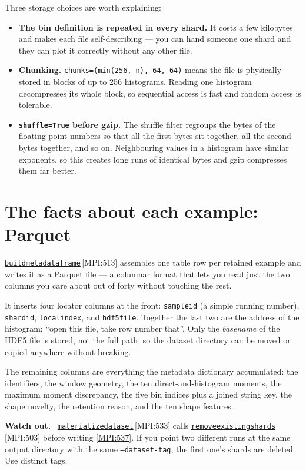 \documentclass[11pt,a4paper]{report}
\newcommand{\srcbase}{vscode://file/Users/syellapa/Documents/Research/2026/ANSYS/Multi-ScalarPDF}
\newcommand{\srctag}[1]{{\footnotesize\textcolor{TagGray}{[#1]}}}
\newcommand{\Mpi}[2]{\href{\srcbase/EnsightPDFHybridDatasetMPI.py:#1}{\texttt{#2}}\,\srctag{MPI:#1}}
\newcommand{\MpiL}[1]{\href{\srcbase/EnsightPDFHybridDatasetMPI.py:#1}{\srctag{MPI:#1}}}
\newcommand{\code}[1]{\texttt{#1}}
\renewcommand{\_}{\origtextunderscore\allowbreak}
\newlength{\calloutwidth}
\newcommand{\calloutOpen}{%
  \par\medskip\noindent
  \setlength{\calloutwidth}{\dimexpr\linewidth-2\fboxsep\relax}%
  \begin{lrbox}{\calloutbox}\begin{minipage}{\calloutwidth}}
\newcommand{\calloutClose}[1]{%
  \end{minipage}\end{lrbox}\colorbox{#1}{\usebox{\calloutbox}}\par\medskip}
\newenvironment{caution}
  {\calloutOpen\textbf{Watch out.}\ }
  {\calloutClose{WarnBG}}
\begin{document}
Three storage choices are worth explaining:

\begin{itemize}
  \item \textbf{The bin definition is repeated in every shard.} It costs a few kilobytes and
        makes each file self-describing --- you can hand someone one shard and they can plot
        it correctly without any other file.
  \item \textbf{Chunking.} \code{chunks=(min(256, n), 64, 64)} means the file is physically
        stored in blocks of up to 256 histograms. Reading one histogram decompresses its
        whole block, so sequential access is fast and random access is tolerable.
  \item \textbf{\code{shuffle=True} before gzip.} The shuffle filter regroups the bytes of the
        floating-point numbers so that all the first bytes sit together, all the second bytes
        together, and so on. Neighbouring values in a histogram have similar exponents, so
        this creates long runs of identical bytes and gzip compresses them far better.
\end{itemize}

\section{The facts about each example: Parquet}

\Mpi{513}{build\_metadata\_frame} assembles one table row per retained example and writes it
as a Parquet file --- a columnar format that lets you read just the two columns you care about
out of forty without touching the rest.

It inserts four locator columns at the front:
\code{sample\_id} (a simple running number), \code{shard\_id}, \code{local\_index}, and
\code{hdf5\_file}. Together the last two are the address of the histogram: ``open this file,
take row number that''. Only the \emph{basename} of the HDF5 file is stored, not the full
path, so the dataset directory can be moved or copied anywhere without breaking.

The remaining columns are everything the metadata dictionary accumulated: the identifiers,
the window geometry, the ten direct-and-histogram moments, the maximum moment discrepancy,
the five bin indices plus a joined string key, the shape novelty, the retention reason, and
the ten shape features.

\begin{caution}
\Mpi{533}{materialize\_dataset} calls \Mpi{503}{remove\_existing\_shards} before writing
\MpiL{537}. If you point two different runs at the same output directory with the same
\code{--dataset-tag}, the first one's shards are deleted. Use distinct tags.
\end{caution}
\end{document}
